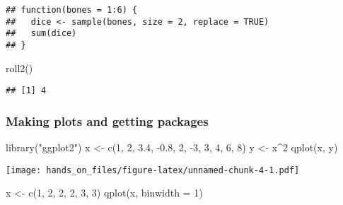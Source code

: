 \documentclass[
]{article}
\newenvironment{Shaded}{\begin{snugshade}}{\end{snugshade}}
\newcommand{\AttributeTok}[1]{\textcolor[rgb]{0.77,0.63,0.00}{#1}}
\newcommand{\DecValTok}[1]{\textcolor[rgb]{0.00,0.00,0.81}{#1}}
\newcommand{\FloatTok}[1]{\textcolor[rgb]{0.00,0.00,0.81}{#1}}
\newcommand{\FunctionTok}[1]{\textcolor[rgb]{0.00,0.00,0.00}{#1}}
\newcommand{\NormalTok}[1]{#1}
\newcommand{\OtherTok}[1]{\textcolor[rgb]{0.56,0.35,0.01}{#1}}
\newcommand{\SpecialCharTok}[1]{\textcolor[rgb]{0.00,0.00,0.00}{#1}}
\newcommand{\StringTok}[1]{\textcolor[rgb]{0.31,0.60,0.02}{#1}}
\begin{document}
\begin{verbatim}
## function(bones = 1:6) {
##   dice <- sample(bones, size = 2, replace = TRUE)
##   sum(dice)
## }
\end{verbatim}

\begin{Shaded}
\begin{Highlighting}[]
\FunctionTok{roll2}\NormalTok{()}
\end{Highlighting}
\end{Shaded}

\begin{verbatim}
## [1] 4
\end{verbatim}

\hypertarget{making-plots-and-getting-packages}{%
\subsubsection{Making plots and getting
packages}\label{making-plots-and-getting-packages}}

\begin{Shaded}
\begin{Highlighting}[]
\FunctionTok{library}\NormalTok{(}\StringTok{"ggplot2"}\NormalTok{)}
\NormalTok{x }\OtherTok{\textless{}{-}} \FunctionTok{c}\NormalTok{(}\DecValTok{1}\NormalTok{, }\DecValTok{2}\NormalTok{, }\FloatTok{3.4}\NormalTok{, }\SpecialCharTok{{-}}\FloatTok{0.8}\NormalTok{, }\DecValTok{2}\NormalTok{, }\SpecialCharTok{{-}}\DecValTok{3}\NormalTok{, }\DecValTok{3}\NormalTok{, }\DecValTok{4}\NormalTok{, }\DecValTok{6}\NormalTok{, }\DecValTok{8}\NormalTok{)}
\NormalTok{y }\OtherTok{\textless{}{-}}\NormalTok{ x}\SpecialCharTok{\^{}}\DecValTok{2}
\FunctionTok{qplot}\NormalTok{(x, y)}
\end{Highlighting}
\end{Shaded}

\texttt{[image: hands\_on\_files/figure-latex/unnamed-chunk-4-1.pdf]}

\begin{Shaded}
\begin{Highlighting}[]
\NormalTok{x }\OtherTok{\textless{}{-}} \FunctionTok{c}\NormalTok{(}\DecValTok{1}\NormalTok{, }\DecValTok{2}\NormalTok{, }\DecValTok{2}\NormalTok{, }\DecValTok{2}\NormalTok{, }\DecValTok{3}\NormalTok{, }\DecValTok{3}\NormalTok{)}
\FunctionTok{qplot}\NormalTok{(x, }\AttributeTok{binwidth =} \DecValTok{1}\NormalTok{)}
\end{Highlighting}
\end{Shaded}
\end{document}
